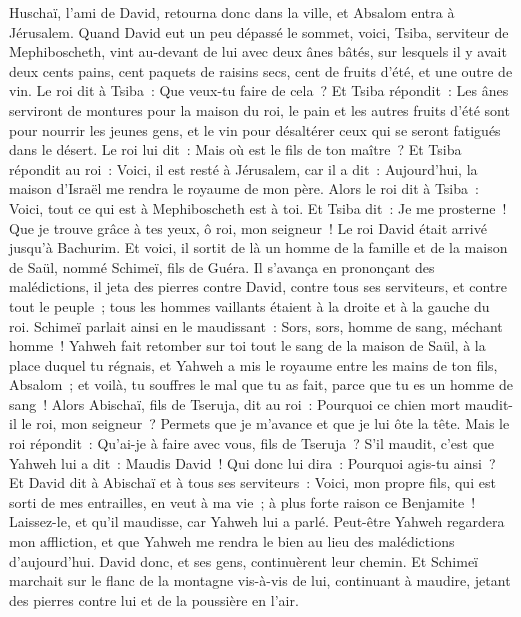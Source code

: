 \begin{multicols}{2}
Huschaï, l'ami de David, retourna donc dans la ville, et Absalom entra à Jérusalem.
\VerseOne{}Quand David eut un peu dépassé le sommet, voici, Tsiba, serviteur de Mephiboscheth, vint au-devant de lui avec deux ânes bâtés, sur lesquels il y avait deux cents pains, cent paquets de raisins secs, cent de fruits d'été, et une outre de vin.
Le roi dit à Tsiba~: Que veux-tu faire de cela~? Et Tsiba répondit~: Les ânes serviront de montures pour la maison du roi, le pain et les autres fruits d'été sont pour nourrir les jeunes gens, et le vin pour désaltérer ceux qui se seront fatigués dans le désert.
Le roi lui dit~: Mais où est le fils de ton maître~? Et Tsiba répondit au roi~: Voici, il est resté à Jérusalem, car il a dit~: Aujourd'hui, la maison d'Israël me rendra le royaume de mon père.
Alors le roi dit à Tsiba~: Voici, tout ce qui est à Mephiboscheth est à toi. Et Tsiba dit~: Je me prosterne~! Que je trouve grâce à tes yeux, ô roi, mon seigneur~!
Le roi David était arrivé jusqu'à Bachurim. Et voici, il sortit de là un homme de la famille et de la maison de Saül, nommé Schimeï, fils de Guéra. Il s'avança en prononçant des malédictions,
il jeta des pierres contre David, contre tous ses serviteurs, et contre tout le peuple~; tous les hommes vaillants étaient à la droite et à la gauche du roi.
Schimeï parlait ainsi en le maudissant~: Sors, sors, homme de sang, méchant homme~!
Yahweh fait retomber sur toi tout le sang de la maison de Saül, à la place duquel tu régnais, et Yahweh a mis le royaume entre les mains de ton fils, Absalom~; et voilà, tu souffres le mal que tu as fait, parce que tu es un homme de sang~!
Alors Abischaï, fils de Tseruja, dit au roi~: Pourquoi ce chien mort maudit-il le roi, mon seigneur~? Permets que je m'avance et que je lui ôte la tête.
Mais le roi répondit~: Qu'ai-je à faire avec vous, fils de Tseruja~? S'il maudit, c'est que Yahweh lui a dit~: Maudis David~! Qui donc lui dira~: Pourquoi agis-tu ainsi~?
Et David dit à Abischaï et à tous ses serviteurs~: Voici, mon propre fils, qui est sorti de mes entrailles, en veut à ma vie~; à plus forte raison ce Benjamite~! Laissez-le, et qu'il maudisse, car Yahweh lui a parlé.
Peut-être Yahweh regardera mon affliction, et que Yahweh me rendra le bien au lieu des malédictions d'aujourd'hui.
David donc, et ses gens, continuèrent leur chemin. Et Schimeï marchait sur le flanc de la montagne vis-à-vis de lui, continuant à maudire, jetant des pierres contre lui et de la poussière en l'air.

\end{multicols}

